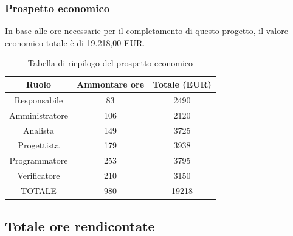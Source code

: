 \subsubsection{Prospetto economico}
In base alle ore necessarie per il completamento di questo progetto, il valore economico totale è di 19.218,00 EUR.
\begin{table}[h]
\caption{Tabella di riepilogo del prospetto economico}
\begin{center}
\begin{tabular}{ |c|c|c|  }
 \hline
 Ruolo 		& Ammontare ore 	& Totale (EUR)\\
 \hline
 \hline
 	Responsabile	& 83 		& 2490\\
	Amministratore	& 106		& 2120\\
	Analista		& 149 		& 3725\\
	Progettista		& 179		& 3938\\
	Programmatore	& 253		& 3795\\
	Verificatore	& 210 		& 3150\\
 \hline\hline
 TOTALE		& 980		& 19218\\
  \hline
\end{tabular}
\end{center}
\end{table}

\newpage
\subsection{Totale ore rendicontate}
